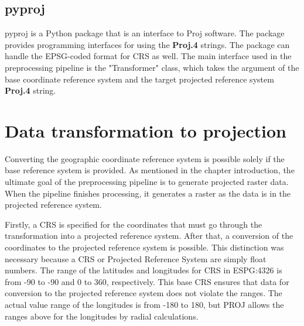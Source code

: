 \subsection{pyproj}
\label{section:pyproj}
pyproj is a Python package that is an interface to Proj software. The package provides programming interfaces for using the \textbf{Proj.4} strings. The package can handle the EPSG-coded format for CRS as well. The main interface used in the preprocessing pipeline is the "Transformer" class, which takes the argument of the base coordinate reference system and the target projected reference system \textbf{Proj.4} string.

\section{Data transformation to projection}
Converting the geographic coordinate reference system is possible solely if the base reference system is provided.
As mentioned in the chapter introduction, the ultimate goal of the preprocessing pipeline is to generate projected raster data. When the pipeline finishes processing, it generates a raster as the data is in the projected reference system.




Firstly, a CRS is specified for the coordinates that must go through the transformation into a projected reference system.
After that, a conversion of the coordinates to the projected reference system is possible.
This distinction was necessary because a CRS or Projected Reference System are simply float numbers.
The range of the latitudes and longitudes for CRS in ESPG:4326 is from -90 to -90 and 0 to 360, respectively.
This base CRS ensures that data for conversion to the projected reference system does not violate the ranges.
The actual value range of the longitudes is from -180 to 180, but PROJ allows the ranges above for the longitudes by radial calculations.

